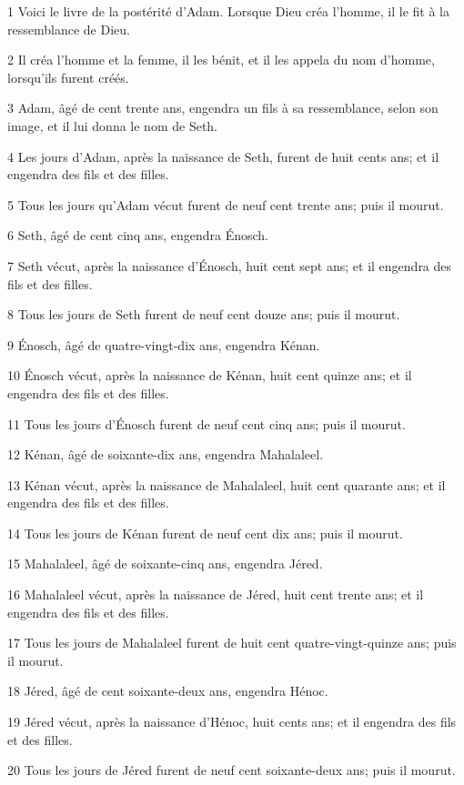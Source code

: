 \par 1 Voici le livre de la postérité d'Adam. Lorsque Dieu créa l'homme, il le fit à la ressemblance de Dieu.
\par 2 Il créa l'homme et la femme, il les bénit, et il les appela du nom d'homme, lorsqu'ils furent créés.
\par 3 Adam, âgé de cent trente ans, engendra un fils à sa ressemblance, selon son image, et il lui donna le nom de Seth.
\par 4 Les jours d'Adam, après la naissance de Seth, furent de huit cents ans; et il engendra des fils et des filles.
\par 5 Tous les jours qu'Adam vécut furent de neuf cent trente ans; puis il mourut.
\par 6 Seth, âgé de cent cinq ans, engendra Énosch.
\par 7 Seth vécut, après la naissance d'Énosch, huit cent sept ans; et il engendra des fils et des filles.
\par 8 Tous les jours de Seth furent de neuf cent douze ans; puis il mourut.
\par 9 Énosch, âgé de quatre-vingt-dix ans, engendra Kénan.
\par 10 Énosch vécut, après la naissance de Kénan, huit cent quinze ans; et il engendra des fils et des filles.
\par 11 Tous les jours d'Énosch furent de neuf cent cinq ans; puis il mourut.
\par 12 Kénan, âgé de soixante-dix ans, engendra Mahalaleel.
\par 13 Kénan vécut, après la naissance de Mahalaleel, huit cent quarante ans; et il engendra des fils et des filles.
\par 14 Tous les jours de Kénan furent de neuf cent dix ans; puis il mourut.
\par 15 Mahalaleel, âgé de soixante-cinq ans, engendra Jéred.
\par 16 Mahalaleel vécut, après la naissance de Jéred, huit cent trente ans; et il engendra des fils et des filles.
\par 17 Tous les jours de Mahalaleel furent de huit cent quatre-vingt-quinze ans; puis il mourut.
\par 18 Jéred, âgé de cent soixante-deux ans, engendra Hénoc.
\par 19 Jéred vécut, après la naissance d'Hénoc, huit cents ans; et il engendra des fils et des filles.
\par 20 Tous les jours de Jéred furent de neuf cent soixante-deux ans; puis il mourut.
